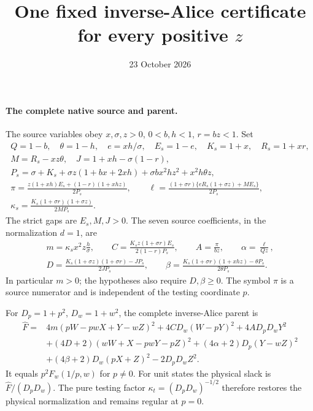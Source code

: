 \documentclass[11pt]{article}
\begin{document}
\title{One fixed inverse-Alice certificate for every positive $z$}
\author{}\date{23 October 2026}\maketitle

\paragraph{The complete native source and parent.}
The source variables obey $x,\sigma,z>0$, $0<b,h<1$,
$r=bz<1$. Set
\begin{gather*}
 Q=1-b,\quad \theta=1-h,\quad e=xh/\sigma,\quad E_s=1-e,
 \quad K_s=1+x,\quad R_s=1+xr,\\
 M=R_s-xz\theta,\quad J=1+xh-\sigma(1-r),\\
 P_s=\sigma+K_s+\sigma z(1+bx+2xh)
                   +\sigma bx^2hz^2+x^2h\theta z,\\
 \pi=\frac{z(1+xh)E_s+(1-r)(1+xhz)}{2P_s},\qquad
 \ell=\frac{(1+\sigma r)\{eR_s(1+\sigma z)+ME_s\}}{2P_s},\\
 \kappa_s=\frac{K_s(1+\sigma r)(1+\sigma z)}{2MP_s}.
\end{gather*}
The strict gaps are $E_s,M,J>0$. The seven source coefficients,
in the normalization $d=1$, are
\begin{gather*}
 m=\kappa_s x^2z\frac h\sigma,\qquad
 C=\frac{K_s z(1+\sigma r)E_s}{2(1-r)P_s},\qquad
 A=\frac\pi{bz},\qquad \alpha=\frac\ell{Qz},\\
 D=\frac{K_s(1+\sigma z)(1+\sigma r)-JP_s}{2JP_s},\qquad
 \beta=\frac{K_s(1+\sigma r)(1+xhz)-\theta P_s}{2\theta P_s}.
\end{gather*}
In particular $m>0$; the hypotheses also require $D,\beta\ge0$.
The symbol $\pi$ is a source numerator and is independent of the
testing coordinate $p$.

For $D_p=1+p^2$, $D_w=1+w^2$, the complete inverse-Alice parent is
\begin{equation}\label{eq:allz-explicit-parent}
\begin{split}
 \widehat F={}&4m(pW-pwX+Y-wZ)^2+4CD_w(W-pY)^2
                         +4AD_pD_wY^2\\
 &+(4D+2)(wW+X-pwY-pZ)^2
        +(4\alpha+2)D_p(Y-wZ)^2\\
 &+(4\beta+2)D_w(pX+Z)^2-2D_pD_wZ^2.
\end{split}
\end{equation}
It equals $p^2F_w(1/p,w)$ for $p\ne0$. For unit states the physical
slack is $\widehat F/(D_pD_w)$. The pure testing factor
$\kappa_t=(D_pD_w)^{-1/2}$ therefore restores the physical normalization
and remains regular at $p=0$.
\end{document}
